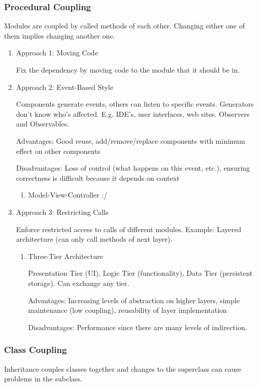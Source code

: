 \documentclass[11pt]{article}
\begin{document}
\subsubsection{Procedural Coupling}
\label{sec:org186af0e}

Modules are coupled by called methods of each other. Changing either one of them implies changing another one.

\begin{enumerate}
\item Approach 1: Moving Code
\label{sec:org97b99ce}

Fix the dependency by moving code to the module that it should be in.

\item Approach 2: Event-Based Style
\label{sec:org8c01dd6}

Components generate events, others can listen to specific events. Generators don't know who's affected. E.g. IDE's, user interfaces, web sites. Observers and Observables.

Advantages: Good reuse, add/remove/replace components with minimum effect on other components

Disadvantages: Loss of control (what happens on this event, etc.), ensuring correctness is difficult because it depends on context

\begin{enumerate}
\item Model-View-Controller :/
\label{sec:org97a602e}
\end{enumerate}

\item Approach 3: Restricting Calls
\label{sec:orgd9e653c}

Enforce restricted access to calls of different modules. Example: Layered architecture (can only call methods of next layer).

\begin{enumerate}
\item Three-Tier Architecture
\label{sec:orga3d2e42}

Presentation Tier (UI), Logic Tier (functionality), Data Tier (persistent storage). Can exchange any tier.

Advantages: Increasing levels of abstraction on higher layers, simple maintenance (low coupling), reusability of layer implementation

Disadvantages: Performance since there are many levels of indirection.
\end{enumerate}
\end{enumerate}

\subsubsection{Class Coupling}
\label{sec:org02123db}

Inheritance couples classes together and changes to the superclass can cause problems in the subclass.
\end{document}

